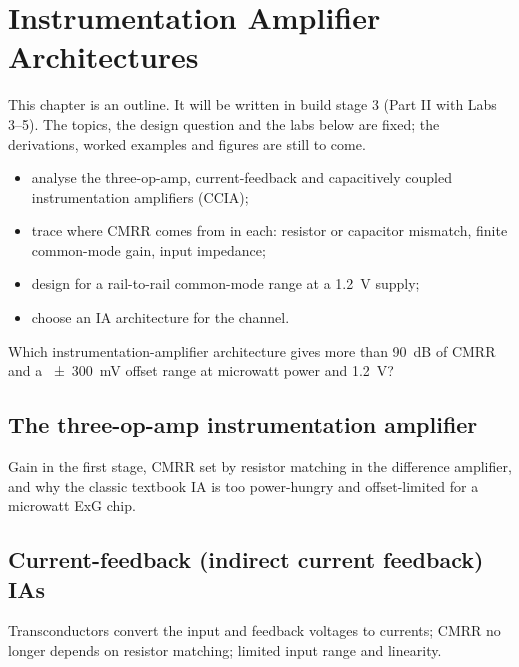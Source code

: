 \chapter{Instrumentation Amplifier Architectures}\label{ch:ia}

\begin{specnote}
This chapter is an outline. It will be written in build stage 3 (Part II with Labs 3--5). The topics, the design question and the labs below are fixed; the derivations, worked examples and figures are still to come.
\end{specnote}

\begin{objectives}
\begin{itemize}
  \item analyse the three-op-amp, current-feedback and capacitively coupled instrumentation amplifiers (CCIA);
  \item trace where CMRR comes from in each: resistor or capacitor mismatch, finite common-mode gain, input impedance;
  \item design for a rail-to-rail common-mode range at a \qty{1.2}{\volt} supply;
  \item choose an IA architecture for the \OB{} channel.
\end{itemize}
\end{objectives}

\begin{insight}
Which instrumentation-amplifier architecture gives more than \qty{90}{\deci\bel} of CMRR and a \qty{\pm 300}{\milli\volt} offset range at microwatt power and \qty{1.2}{\volt}?
\end{insight}

\section{The three-op-amp instrumentation amplifier}\label{sec:ch7-1}
Gain in the first stage, CMRR set by resistor matching in the difference amplifier, and why the classic textbook IA is too power-hungry and offset-limited for a microwatt ExG chip.

\section{Current-feedback (indirect current feedback) IAs}\label{sec:ch7-2}
Transconductors convert the input and feedback voltages to currents; CMRR no longer depends on resistor matching; limited input range and linearity.

